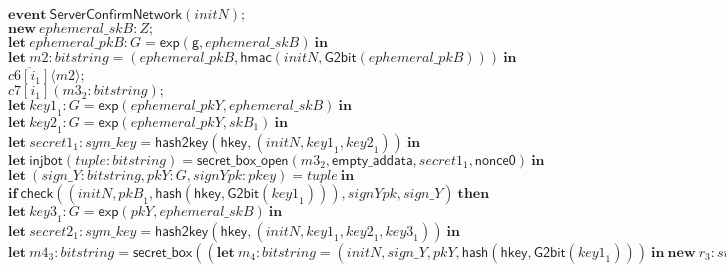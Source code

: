 \documentclass{article}
\newcommand{\cinput}[2]{{#1}({#2})}
\newcommand{\coutput}[2]{\overline{#1}\langle{#2}\rangle}
\newcommand{\kw}[1]{\mathbf{#1}}
\newcommand{\kwf}[1]{\mathsf{#1}}
\newcommand{\var}[1]{\mathit{#1}}
\newcommand{\kwt}[1]{\mathit{#1}}
\newcommand{\kwc}[1]{\mathit{#1}}
\begin{document}
\begin{tabbing}
\>$\quad \kw{event}\ \kwf{ServerConfirmNetwork}(\var{initN});$\\
\>$\quad \kw{new}\ \var{ephemeral{\_}skB}: \kwt{Z};$\\
\>$\quad \kw{let}\ \var{ephemeral{\_}pkB}: \kwt{G} = \kwf{exp}(\kwf{g}, \var{ephemeral{\_}skB})\ \kw{in}$\\
\>$\quad \kw{let}\ \var{m2}: \kwt{bitstring} = \kwf{}(\var{ephemeral{\_}pkB}, \kwf{hmac}(\var{initN}, \kwf{G2bit}(\var{ephemeral{\_}pkB})))\ \kw{in}$\\
\>$\quad \coutput{\kwc{c6}[\var{i}_{1}]}{\var{m2}};$\\
\>$\quad \cinput{\kwc{c7}[\var{i}_{1}]}{\var{m3}_{2}: \kwt{bitstring}};$\\
\>$\quad \kw{let}\ \var{key1}_{1}: \kwt{G} = \kwf{exp}(\var{ephemeral{\_}pkY}, \var{ephemeral{\_}skB})\ \kw{in}$\\
\>$\quad \kw{let}\ \var{key2}_{1}: \kwt{G} = \kwf{exp}(\var{ephemeral{\_}pkY}, \var{skB}_{1})\ \kw{in}$\\
\>$\quad \kw{let}\ \var{secret1}_{1}: \kwt{sym{\_}key} = \kwf{hash2key}(\kwf{hkey}, \kwf{}(\var{initN}, \var{key1}_{1}, \var{key2}_{1}))\ \kw{in}$\\
\>$\quad \kw{let}\ \kwf{injbot}(\var{tuple}: \kwt{bitstring}) = \kwf{secret{\_}box{\_}open}(\var{m3}_{2}, \kwf{empty{\_}addata}, \var{secret1}_{1}, \kwf{nonce0})\ \kw{in}$\\
\>$\quad \kw{let}\ \kwf{}(\var{sign{\_}Y}: \kwt{bitstring}, \var{pkY}: \kwt{G}, \var{signYpk}: \kwt{pkey}) = \var{tuple}\ \kw{in}$\\
\>$\quad \kw{if}\ \kwf{check}(\kwf{}(\var{initN}, \var{pkB}_{1}, \kwf{hash}(\kwf{hkey}, \kwf{G2bit}(\var{key1}_{1}))), \var{signYpk}, \var{sign{\_}Y})\ \kw{then}$\\
\>$\quad \kw{let}\ \var{key3}_{1}: \kwt{G} = \kwf{exp}(\var{pkY}, \var{ephemeral{\_}skB})\ \kw{in}$\\
\>$\quad \kw{let}\ \var{secret2}_{1}: \kwt{sym{\_}key} = \kwf{hash2key}(\kwf{hkey}, \kwf{}(\var{initN}, \var{key1}_{1}, \var{key2}_{1}, \var{key3}_{1}))\ \kw{in}$\\
\>$\quad \kw{let}\ \var{m4}_{3}: \kwt{bitstring} = \kwf{secret{\_}box}((\kw{let}\ \var{m}_{4}: \kwt{bitstring} = \kwf{}(\var{initN}, \var{sign{\_}Y}, \var{pkY}, \kwf{hash}(\kwf{hkey}, \kwf{G2bit}(\var{key1}_{1})))\ \kw{in}\ \kw{new}\ \var{r}_{3}: \kwt{sign{\_}seed};\ \kwf{sign{\_}r}(\var{m}_{4}, \var{signBsk}, \var{r}_{3})), \kwf{empty{\_}addata}, \var{secret2}_{1}, \kwf{nonce0})\ \kw{in}$\\

\end{tabbing}
\end{document}
